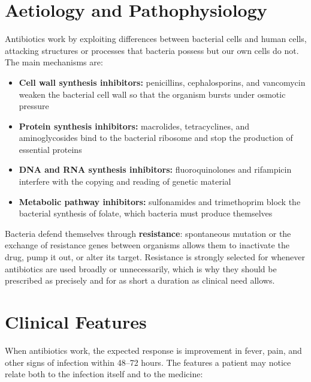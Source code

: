 \section*{Aetiology and Pathophysiology}
Antibiotics work by exploiting differences between bacterial cells and human cells, attacking structures or processes that bacteria possess but our own cells do not. The main mechanisms are:

\begin{itemize}
    \item \textbf{Cell wall synthesis inhibitors:} penicillins, cephalosporins, and vancomycin weaken the bacterial cell wall so that the organism bursts under osmotic pressure
    \item \textbf{Protein synthesis inhibitors:} macrolides, tetracyclines, and aminoglycosides bind to the bacterial ribosome and stop the production of essential proteins
    \item \textbf{DNA and RNA synthesis inhibitors:} fluoroquinolones and rifampicin interfere with the copying and reading of genetic material
    \item \textbf{Metabolic pathway inhibitors:} sulfonamides and trimethoprim block the bacterial synthesis of folate, which bacteria must produce themselves
\end{itemize}

Bacteria defend themselves through \textbf{resistance}: spontaneous mutation or the exchange of resistance genes between organisms allows them to inactivate the drug, pump it out, or alter its target. Resistance is strongly selected for whenever antibiotics are used broadly or unnecessarily, which is why they should be prescribed as precisely and for as short a duration as clinical need allows.

\section*{Clinical Features}
When antibiotics work, the expected response is improvement in fever, pain, and other signs of infection within 48--72 hours. The features a patient may notice relate both to the infection itself and to the medicine:

